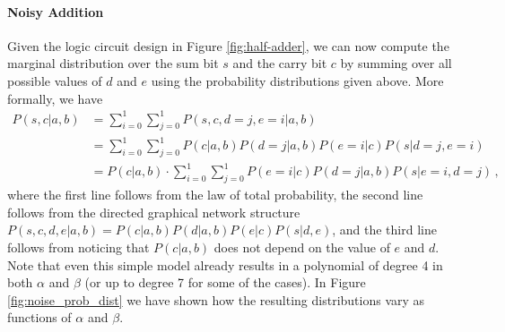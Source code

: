 \paragraph{Noisy Addition} Given the logic circuit design in Figure \ref{fig:half-adder}, we can now compute the marginal distribution over the sum bit $s$ and the carry bit $c$ by summing over all possible values of $d$ and $e$ using the probability distributions given above. More formally, we have 
\begin{align}
    P(s,c|a,b) & = \sum_{i=0}^1 \sum_{j=0}^1 P(s,c,d=j,e=i|a,b) \\
    & = \sum_{i=0}^1 \sum_{j=0}^1 P(c|a,b) P(d=j|a,b) P(e=i|c) P(s|d=j,e=i) \\
    & = P(c|a,b) \cdot \sum_{i=0}^1 \sum_{j=0}^1 P(e=i|c) P(d=j|a,b) P(s|e=i,d=j) \,,
\end{align}
where the first line follows from the law of total probability, the second line follows from the directed graphical network structure $P(s,c,d,e|a,b)=P(c|a,b)P(d|a,b)P(e|c)P(s|d,e)$, and the third line follows from noticing that $P(c|a,b)$ does not depend on the value of $e$ and $d$. Note that even this simple model already results in a polynomial of degree 4 in both $\alpha$ and $\beta$ (or up to degree 7 for some of the cases). In Figure \ref{fig:noise_prob_dist} we have shown how the resulting distributions vary as functions of $\alpha$ and $\beta$.
